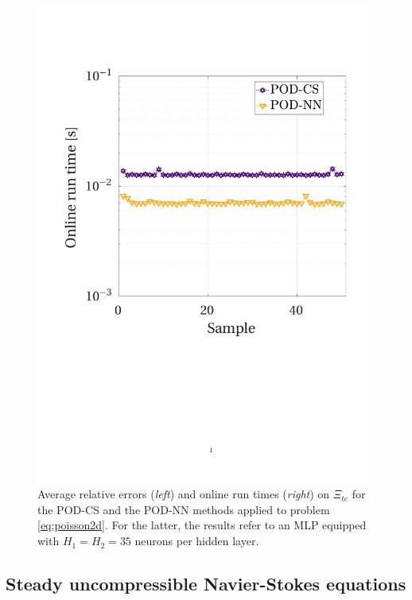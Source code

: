 \documentclass{elsarticle}
\numberwithin{equation}{section}
\theoremstyle{theorem}
\theoremstyle{definition}
\theoremstyle{remark}
\theoremstyle{proposition}
\numberwithin{figure}{section}
\begin{document}
\begin{figure}[t!]
			\includegraphics[scale = 0.38, trim = {1.5cm 8.9cm 1.5cm 3.8cm}, clip]{poisson2d_3_cs_time}
			
			\caption{Average relative errors (\emph{left}) and online run times (\emph{right}) on $\Xi_{te}$ for the POD-CS and the POD-NN methods applied to problem \eqref{eq:poisson2d}. For the latter, the results refer to an MLP equipped with $H_1 = H_2 = 35$ neurons per hidden layer.}
			\label{fig:poisson2d-fig5}
		\end{figure}
		
		
		
	\subsection{Steady uncompressible Navier-Stokes equations}
	\label{section:Steady uncompressible Navier-Stokes equations}
	
\end{document}
